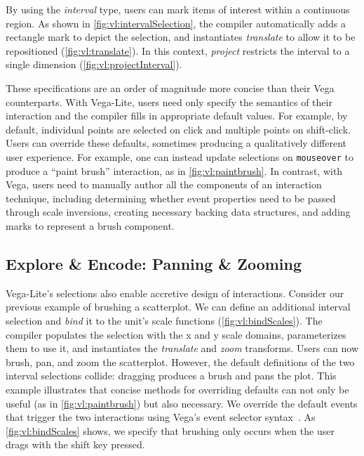 By using the \emph{interval} type, users can mark items of interest within a
continuous region. As shown in \cref{fig:vl:intervalSelection}, the compiler
automatically adds a rectangle mark to depict the selection, and instantiates
\emph{translate} to allow it to be repositioned (\cref{fig:vl:translate}). In this
context, \emph{project} restricts the interval to a single dimension
(\cref{fig:vl:projectInterval}).

These specifications are an order of magnitude more concise than their Vega
counterparts. With Vega-Lite, users need only specify the semantics of their
interaction and the compiler fills in appropriate default values. For example,
by default, individual points are selected on click and multiple points on
shift-click. Users can override these defaults, sometimes producing a
qualitatively different user experience. For example, one can instead update
selections on \texttt{mouseover} to produce a ``paint brush'' interaction, as in
\cref{fig:vl:paintbrush}. In contrast, with Vega, users need to manually author all
the components of an interaction technique, including determining whether event
properties need to be passed through scale inversions, creating necessary
backing data structures, and adding marks to represent a brush component.

\subsection{Explore \& Encode: Panning \& Zooming}

Vega-Lite's selections also enable accretive design of interactions. Consider
our previous example of brushing a scatterplot. We can define an additional
interval selection and \emph{bind} it to the unit's scale functions
(\cref{fig:vl:bindScales}). The compiler populates the selection with the x and y
scale domains, parameterizes them to use it, and instantiates the
\emph{translate} and \emph{zoom} transforms. Users can now brush, pan, and zoom
the scatterplot. However, the default definitions of the two interval selections
collide: dragging produces a brush and pans the plot. This example illustrates
that concise methods for overriding defaults can not only be useful (as in
\cref{fig:vl:paintbrush}) but also necessary. We override the default events that
trigger the two interactions using Vega's event selector
syntax~\cite{reactive-vega-model}. As \cref{fig:vl:bindScales} shows, we specify
that brushing only occurs when the user drags with the shift key pressed.

